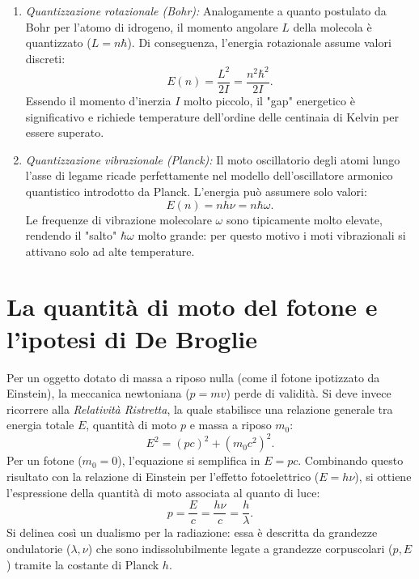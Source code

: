 \documentclass[a4paper,11pt]{report}
\begin{document}
\begin{enumerate}
    \item \textit{Quantizzazione rotazionale (Bohr):} Analogamente a quanto postulato da Bohr per l'atomo di idrogeno, il momento angolare $L$ della molecola è quantizzato ($L = n\hbar$). Di conseguenza, l'energia rotazionale assume valori discreti:
    \begin{equation}
        E(n) = \frac{L^2}{2I} = \frac{n^2\hbar^2}{2I}.
    \end{equation}
    Essendo il momento d'inerzia $I$ molto piccolo, il "gap" energetico è significativo e richiede temperature dell'ordine delle centinaia di Kelvin per essere superato.
    
    \item \textit{Quantizzazione vibrazionale (Planck):} Il moto oscillatorio degli atomi lungo l'asse di legame ricade perfettamente nel modello dell'oscillatore armonico quantistico introdotto da Planck. L'energia può assumere solo valori:
    \begin{equation}
        E(n) = nh\nu = n\hbar\omega.
    \end{equation}
    Le frequenze di vibrazione molecolare $\omega$ sono tipicamente molto elevate, rendendo il "salto" $\hbar\omega$ molto grande: per questo motivo i moti vibrazionali si attivano solo ad alte temperature.
\end{enumerate}


 \section{La quantità di moto del fotone e l'ipotesi di De Broglie}
Per un oggetto dotato di massa a riposo nulla (come il fotone ipotizzato da Einstein), la meccanica newtoniana ($p=mv$) perde di validità. Si deve invece ricorrere alla \textit{Relatività Ristretta}, la quale stabilisce una relazione generale tra energia totale $E$, quantità di moto $p$ e massa a riposo $m_0$:
\begin{equation}
E^2 = (pc)^2 + (m_0c^2)^2.
\end{equation}
Per un fotone ($m_0 = 0$), l'equazione si semplifica in $E = pc$. Combinando questo risultato con la relazione di Einstein per l'effetto fotoelettrico ($E = h\nu$), si ottiene l'espressione della quantità di moto associata al quanto di luce:
\begin{equation}
p = \frac{E}{c} = \frac{h\nu}{c} = \frac{h}{\lambda}.
\label{eq:momento_fotone}
\end{equation}
Si delinea così un dualismo per la radiazione: essa è descritta da grandezze ondulatorie ($\lambda, \nu$) che sono indissolubilmente legate a grandezze corpuscolari ($p, E$) tramite la costante di Planck $h$.
\end{document}
